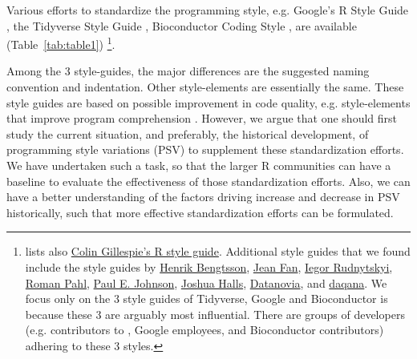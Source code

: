 Various efforts to standardize the programming style, e.g. Google's R Style Guide \citep{google}, the Tidyverse Style Guide \citep{tidyverse}, Bioconductor Coding Style \citep{bioconductor},  are available (Table~\ref{tab:table1}) \footnote{\citet{baaaath} lists also \href{https://csgillespie.wordpress.com/2010/11/23/r-style-guide/}{Colin Gillespie's R style guide}.  Additional style guides that we found include the style guides by \href{https://docs.google.com/document/d/1esDVxyWvH8AsX-VJa-8oqWaHLs4stGlIbk8kLc5VlII/edit}{Henrik Bengtsson}, \href{https://jef.works/R-style-guide/}{Jean Fan}, \href{https://irudnyts.github.io//r-coding-style-guide/}{Iegor Rudnytskyi}, \href{https://rpahl.github.io/r-some-blog/my-r-style-guide/}{Roman Pahl}, \href{https://cran.r-project.org/web/packages/rockchalk/vignettes/Rstyle.pdf}{Paul E. Johnson}, \href{https://bookdown.org/joshuah40/qa_code/Coding-Guidelines.html}{Joshua Halls},  \href{https://www.datanovia.com/en/blog/r-coding-style-best-practices/}{Datanovia}, and \href{https://www.daqana.org/dqstyle-r/}{daqana}. We focus only on the 3 style guides of Tidyverse, Google and Bioconductor is because these 3 are arguably most influential. There are groups of developers (e.g. contributors to , Google employees, and Bioconductor contributors) adhering to these 3 styles.}.

Among the 3 style-guides, the major differences are the suggested naming convention and indentation. Other style-elements are essentially the same. These style guides are based on possible improvement in code quality, e.g. style-elements that improve program comprehension \citep{oman}. However, we argue that one should first study the current situation, and preferably, the historical development, of programming style variations (PSV) to supplement these standardization efforts. We have undertaken such a task, so that the larger R communities can have a baseline to evaluate the effectiveness of those standardization efforts. Also, we can have a better understanding of the factors driving increase and decrease in PSV historically, such that more effective standardization efforts can be formulated.


